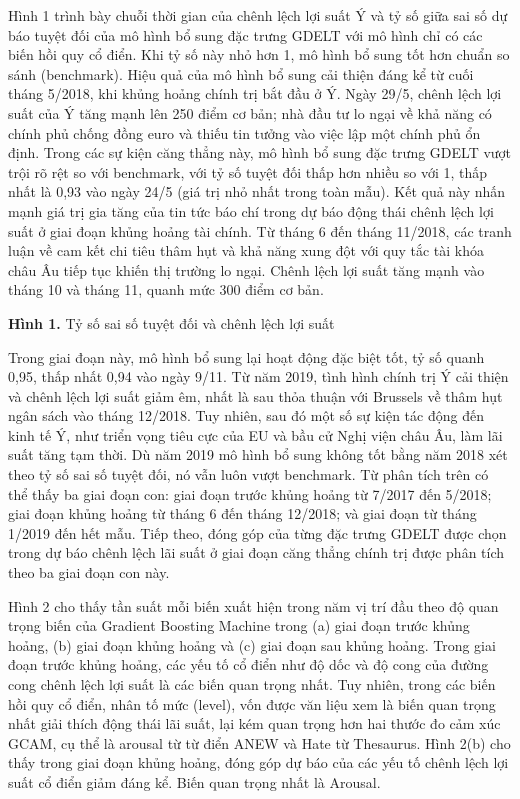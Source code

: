 Hình 1 trình bày chuỗi thời gian của chênh lệch lợi suất Ý và tỷ số giữa sai số dự báo tuyệt đối của mô hình bổ sung đặc trưng GDELT với mô hình chỉ có các biến hồi quy cổ điển. Khi tỷ số này nhỏ hơn 1, mô hình bổ sung tốt hơn chuẩn so sánh (benchmark). Hiệu quả của mô hình bổ sung cải thiện đáng kể từ cuối tháng 5/2018, khi khủng hoảng chính trị bắt đầu ở Ý. Ngày 29/5, chênh lệch lợi suất của Ý tăng mạnh lên 250 điểm cơ bản; nhà đầu tư lo ngại về khả năng có chính phủ chống đồng euro và thiếu tin tưởng vào việc lập một chính phủ ổn định. Trong các sự kiện căng thẳng này, mô hình bổ sung đặc trưng GDELT vượt trội rõ rệt so với benchmark, với tỷ số tuyệt đối thấp hơn nhiều so với 1, thấp nhất là 0,93 vào ngày 24/5 (giá trị nhỏ nhất trong toàn mẫu). Kết quả này nhấn mạnh giá trị gia tăng của tin tức báo chí trong dự báo động thái chênh lệch lợi suất ở giai đoạn khủng hoảng tài chính. Từ tháng 6 đến tháng 11/2018, các tranh luận về cam kết chi tiêu thâm hụt và khả năng xung đột với quy tắc tài khóa châu Âu tiếp tục khiến thị trường lo ngại. Chênh lệch lợi suất tăng mạnh vào tháng 10 và tháng 11, quanh mức 300 điểm cơ bản.

\textbf{Hình 1.} Tỷ số sai số tuyệt đối và chênh lệch lợi suất

Trong giai đoạn này, mô hình bổ sung lại hoạt động đặc biệt tốt, tỷ số quanh 0,95, thấp nhất 0,94 vào ngày 9/11. Từ năm 2019, tình hình chính trị Ý cải thiện và chênh lệch lợi suất giảm êm, nhất là sau thỏa thuận với Brussels về thâm hụt ngân sách vào tháng 12/2018. Tuy nhiên, sau đó một số sự kiện tác động đến kinh tế Ý, như triển vọng tiêu cực của EU và bầu cử Nghị viện châu Âu, làm lãi suất tăng tạm thời. Dù năm 2019 mô hình bổ sung không tốt bằng năm 2018 xét theo tỷ số sai số tuyệt đối, nó vẫn luôn vượt benchmark. Từ phân tích trên có thể thấy ba giai đoạn con: giai đoạn trước khủng hoảng từ 7/2017 đến 5/2018; giai đoạn khủng hoảng từ tháng 6 đến tháng 12/2018; và giai đoạn từ tháng 1/2019 đến hết mẫu. Tiếp theo, đóng góp của từng đặc trưng GDELT được chọn trong dự báo chênh lệch lãi suất ở giai đoạn căng thẳng chính trị được phân tích theo ba giai đoạn con này.

Hình 2 cho thấy tần suất mỗi biến xuất hiện trong năm vị trí đầu theo độ quan trọng biến của Gradient Boosting Machine trong (a) giai đoạn trước khủng hoảng, (b) giai đoạn khủng hoảng và (c) giai đoạn sau khủng hoảng. Trong giai đoạn trước khủng hoảng, các yếu tố cổ điển như độ dốc và độ cong của đường cong chênh lệch lợi suất là các biến quan trọng nhất. Tuy nhiên, trong các biến hồi quy cổ điển, nhân tố mức (level), vốn được văn liệu xem là biến quan trọng nhất giải thích động thái lãi suất, lại kém quan trọng hơn hai thước đo cảm xúc GCAM, cụ thể là arousal từ từ điển ANEW và Hate từ Thesaurus. Hình 2(b) cho thấy trong giai đoạn khủng hoảng, đóng góp dự báo của các yếu tố chênh lệch lợi suất cổ điển giảm đáng kể. Biến quan trọng nhất là Arousal.

